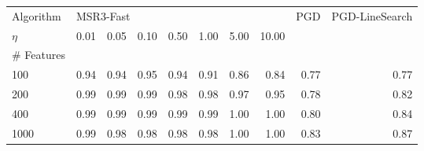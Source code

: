 \begin{tabular}{l||rrrrrrr|r|r}
\toprule
Algorithm & \multicolumn{7}{l}{MSR3-Fast} &   PGD & PGD-LineSearch \\
$\eta$ &     0.01  & 0.05  & 0.10  & 0.50  & 1.00  & 5.00  & 10.00 &   &           \\
\hline \hline
\# Features &           &       &       &       &       &       &       &       &                \\

100                &      0.94 &  0.94 &  0.95 &  0.94 &  0.91 &  0.86 &  0.84 &  0.77 &           0.77 \\
200                &      0.99 &  0.99 &  0.99 &  0.98 &  0.98 &  0.97 &  0.95 &  0.78 &           0.82 \\
400                &      0.99 &  0.99 &  0.99 &  0.99 &  0.99 &  1.00 &  1.00 &  0.80 &           0.84 \\
1000               &      0.99 &  0.98 &  0.98 &  0.98 &  0.98 &  1.00 &  1.00 &  0.83 &           0.87 \\
\bottomrule
\end{tabular}

